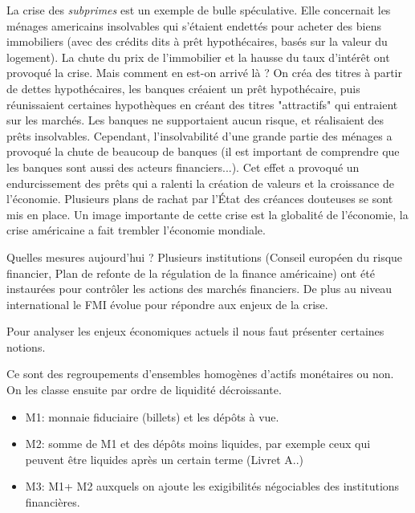 La crise des \emph{subprimes} est un exemple de bulle spéculative. Elle concernait les ménages americains insolvables qui s'étaient endettés pour acheter des
biens immobiliers (avec des crédits dits à prêt hypothécaires, basés sur la valeur du logement). La chute du prix de l'immobilier et la hausse du taux d'intérêt ont 
provoqué la crise. Mais comment en est-on arrivé là ? On créa des titres à partir de dettes hypothécaires, les banques créaient un prêt hypothécaire, puis réunissaient 
certaines hypothèques en créant des titres "attractifs" qui entraient sur les marchés. Les banques ne supportaient aucun risque, et réalisaient des prêts 
insolvables. Cependant, l'insolvabilité d'une grande partie des ménages a provoqué la chute de beaucoup de banques (il est important de comprendre que les 
banques sont aussi des acteurs financiers...). Cet effet a provoqué un endurcissement des prêts qui a ralenti la création de valeurs et la croissance de 
l'économie. Plusieurs plans de rachat par l'État des créances douteuses se sont mis en place. Un image importante de cette crise est la globalité de 
l'économie, la crise américaine a fait trembler l'économie mondiale. 

Quelles mesures aujourd'hui ? Plusieurs institutions (Conseil européen du risque financier, Plan de refonte de la régulation de la finance américaine) ont été
 instaurées pour contrôler les actions des marchés financiers. De plus au niveau international le FMI évolue pour répondre aux enjeux de la crise. 
 
Pour analyser les enjeux économiques actuels il nous faut présenter certaines notions.

\begin{tcolorbox}[title=Les agrégats monétaires]
	Ce sont des regroupements d'ensembles homogènes d'actifs monétaires ou non. On les classe ensuite par ordre de liquidité décroissante. 
	\begin{itemize}[label=]
		\item M1: monnaie fiduciaire (billets) et les dépôts à vue.
		\item M2: somme de M1 et des dépôts moins liquides, par exemple ceux qui peuvent être liquides après un certain terme (Livret A..)
		\item M3: M1+ M2 auxquels on ajoute les exigibilités négociables des institutions financières.
	\end{itemize}
	
\end{tcolorbox}

